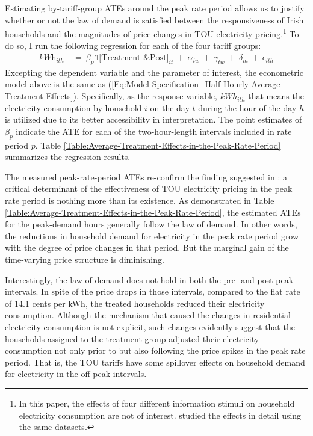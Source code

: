 Estimating by-tariff-group ATEs around the peak rate period allows us to justify whether or not the law of demand is satisfied between the responsiveness of Irish households and the magnitudes of price changes in TOU electricity pricing.\footnote{In this paper, the effects of four different information stimuli on household electricity consumption are not of interest. \cite{The-Effect-of-Information-on-TOU-Electricity-Use:An-Irish-Residential-Study_Pon_2017} studied the effects in detail using the same datasets.} To do so, I run the following regression for each of the four tariff groups:
\begin{equation}
\begin{split}
    \textit{kWh}_{ith} \ 
    & = \ \beta_{p} \mathbb{1}\big[ \text{Treatment \& Post} \big]_{it} \ + \ \alpha_{iw} \ + \ \gamma_{tw} \ + \ \delta_{m} \ + \ \epsilon_{ith}
\end{split}
\label{Eq:Model-Specification_Hourly-Average-Treatment-Effects}
\end{equation}
Excepting the dependent variable and the parameter of interest, the econometric model above is the same as (\ref{Eq:Model-Specification_Half-Hourly-Average-Treatment-Effects}). Specifically, as the response variable, $kWh_{ith}$ that means the electricity consumption by household $i$ on the day $t$ during the hour of the day $h$ is utilized due to its better accessibility in interpretation. The point estimates of $\beta_{p}$ indicate the ATE for each of the two-hour-length intervals included in rate period $p$. Table \ref{Table:Average-Treatment-Effects-in-the-Peak-Rate-Period} summarizes the regression results. 

The measured peak-rate-period ATEs re-confirm the finding suggested in \cite{Peaking-Interest:How-Awareness-Drives-the-Effectiveness-of-Time-of-Use-Electricity-Pricing_Prest_2020}: a critical determinant of the effectiveness of TOU electricity pricing in the peak rate period is nothing more than its existence. As demonstrated in Table \ref{Table:Average-Treatment-Effects-in-the-Peak-Rate-Period}, the estimated ATEs for the peak-demand hours generally follow the law of demand. In other words, the reductions in household demand for electricity in the peak rate period grow with the degree of price changes in that period. But the marginal gain of the time-varying price structure is diminishing. 

Interestingly, the law of demand does not hold in both the pre- and post-peak intervals. In spite of the price drops in those intervals, compared to the flat rate of 14.1 cents per kWh, the treated households reduced their electricity consumption. Although the mechanism that caused the changes in residential electricity consumption is not explicit, such changes evidently suggest that the households assigned to the treatment group adjusted their electricity consumption not only prior to but also following the price spikes in the peak rate period. That is, the TOU tariffs have some spillover effects on household demand for electricity in the off-peak intervals. 

